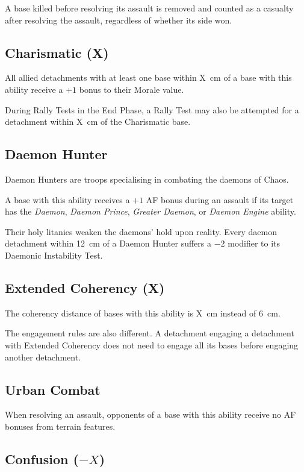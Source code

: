A base killed before resolving its assault is removed and counted as a casualty after resolving the assault, regardless of whether its side won.

\subsection{Charismatic (X)}

All allied detachments with at least one base within X~cm of a base with this ability receive a $+1$ bonus to their Morale value.

During Rally Tests in the End Phase, a Rally Test may also be attempted for a detachment within X~cm of the Charismatic base.

\subsection{Daemon Hunter}

Daemon Hunters are troops specialising in combating the daemons of Chaos.

A base with this ability receives a $+1$ AF bonus during an assault if its target has the \textit{Daemon}, \textit{Daemon Prince}, \textit{Greater Daemon}, or \textit{Daemon Engine} ability.

Their holy litanies weaken the daemons' hold upon reality. Every daemon detachment within 12~cm of a Daemon Hunter suffers a $-2$ modifier to its Daemonic Instability Test.

\subsection{Extended Coherency (X)}

The coherency distance of bases with this ability is X~cm instead of 6~cm.

The engagement rules are also different. A detachment engaging a detachment with Extended Coherency does not need to engage all its bases before engaging another detachment.

\subsection{Urban Combat}

When resolving an assault, opponents of a base with this ability receive no AF bonuses from terrain features.

\subsection{Confusion ($-X$)}

